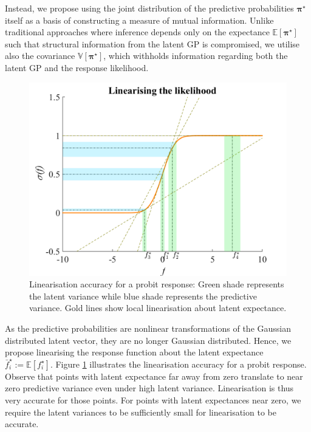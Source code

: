 \documentclass{article}
\renewcommand{\vec}[1]{\boldsymbol{#1}}
\begin{document}
		Instead, we propose using the joint distribution of the predictive probabilities $\vec{\pi^{\star}}$ itself as a basis of constructing a measure of mutual information. Unlike traditional approaches where inference depends only on the expectance $\mathbb{E}[\vec{\pi^{\star}}]$ such that structural information from the latent GP is compromised, we utilise also the covariance $\mathbb{V}[\vec{\pi^{\star}}]$, which withholds information regarding both the latent GP and the response likelihood.
	
		\begin{figure}[!htbp]
			\centering
				\includegraphics[width = \linewidth]{Figures/linearisation.png}
			\caption{Linearisation accuracy for a probit response: Green shade represents the latent variance while blue shade represents the predictive variance. Gold lines show local linearisation about latent expectance.}
			\label{Figure:Linearisation}
		\end{figure}
			
		As the predictive probabilities are nonlinear transformations of the Gaussian distributed latent vector, they are no longer Gaussian distributed. Hence, we propose linearising the response function about the latent expectance $\bar{f}^{\star}_{i} := \mathbb{E}[f^{\star}_{i}]$. Figure \ref{Figure:Linearisation} illustrates the linearisation accuracy for a probit response. Observe that points with latent expectance far away from zero translate to near zero predictive variance even under high latent variance. Linearisation is thus very accurate for those points. For points with latent expectances near zero, we require the latent variances to be sufficiently small for linearisation to be accurate.
\end{document}
